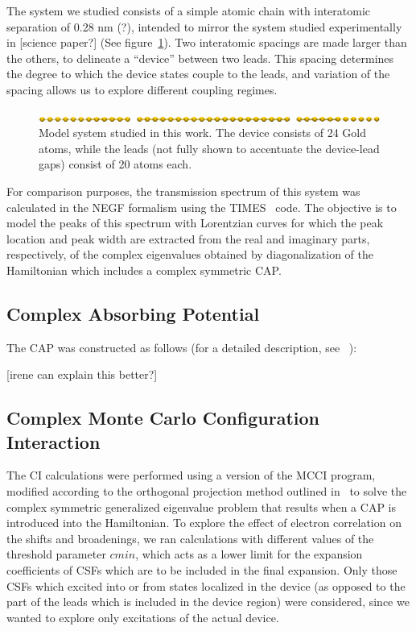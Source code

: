 The system we studied consists of a simple atomic chain with interatomic
separation of 0.28 nm (?), intended to mirror the system studied experimentally
in [science paper?] (See figure~\ref{fig:chaincapdevice}). Two interatomic
spacings are made larger than the others, to delineate a ``device'' between two
leads. This spacing determines the degree to which the device states couple to
the leads, and variation of the spacing allows us to explore different coupling
regimes.

\begin{figure}
	\begin{center}
		\includegraphics[width=0.9\linewidth]{figures/chaincapdevice}
	\end{center}
	\caption{Model system studied in this work. The device consists of 24
	Gold atoms, while the leads (not fully shown to accentuate the
	device-lead gaps) consist of 20 atoms each.}
	\label{fig:chaincapdevice}
\end{figure}

For comparison purposes, the transmission spectrum of this system was
calculated in the \ac{NEGF} formalism using the TIMES~\cite{times} code. The
objective is to model the peaks of this spectrum with Lorentzian curves for
which the peak location and peak width are extracted from the real and
imaginary parts, respectively, of the complex eigenvalues obtained by
diagonalization of the Hamiltonian which includes a complex symmetric \ac{CAP}.

\subsection{Complex Absorbing Potential}
\label{subsec:CAP}

The \ac{CAP} was constructed as follows (for a detailed description, see~
\cite{henderson}):

[irene can explain this better?]

\subsection{Complex Monte Carlo Configuration Interaction}

The \ac{CI} calculations were performed using a version of the \ac{MCCI}
program, modified according to the orthogonal projection method outlined
in~\cite{tarantelli_csd} to solve the complex symmetric generalized eigenvalue
problem that results when a \ac{CAP} is introduced into the Hamiltonian. To
explore the effect of electron correlation on the shifts and broadenings, we
ran calculations with different values of the threshold parameter $cmin$, which
acts as a lower limit for the expansion coefficients of \acp{CSF} which are to
be included in the final expansion. Only those \acp{CSF} which excited into or
from states localized in the device (as opposed to the part of the leads which
is included in the device region) were considered, since we wanted to explore
only excitations of the actual device.

